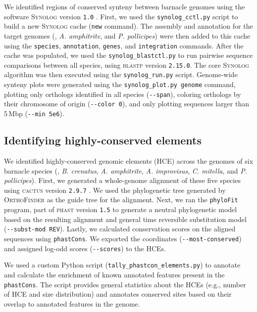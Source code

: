 We identified regions of conserved synteny between barnacle genomes using the software
\textsc{Synolog} version \texttt{1.0} \citep{madrigal_synolog_2026}.
First, we used the \texttt{synolog\_cctl.py} script to build a new \textsc{Synolog}
cache (\texttt{new} command).
The assembly and annotation for the target genomes (\bgla{},
\textit{A. amphitrite}, and \textit{P. pollicipes}) were then added to this cache
using the \texttt{species}, \texttt{annotation}, \texttt{genes}, and
\texttt{integration} commands.
After the cache was populated, we used the \texttt{synolog\_blastctl.py} to run
pairwise sequence comparisons between all species, using \textsc{blastp}
version \texttt{2.15.0}.
The core \textsc{Synolog} algorithm was then executed using the \texttt{synolog\_run.py}
script.
Genome-wide synteny plots were generated using the \texttt{synolog\_plot.py genome}
command, plotting only orthologs identified in all species (\texttt{-{}-span}), coloring
orthologs by their chromosome of origin (\texttt{-{}-color 0}), and only plotting
sequences larger than 5\,Mbp (\texttt{-{}-min 5e6}).

\subsection*{Identifying highly-conserved elements}

We identified highly-conserved genomic elements (HCE) across the genomes of six
barnacle species (\bgla, \textit{B. crenatus}, \textit{A. amphitrite},
\textit{A. improvisus}, \textit{C. mitella}, and \textit{P. pollicipes}).
First, we generated a whole-genome alignment of these five species using
\textsc{cactus} version \texttt{2.9.7} \citep{armstrong_progressive_2020}.
We used the phylogenetic tree generated by \textsc{OrthoFinder} as the guide tree
for the alignment.
Next, we ran the \texttt{phyloFit} program, part of \textsc{phast} version
\texttt{1.5} \citep{siepel_evolutionarily_2005} to generate a neutral
phylogenetic model based on the resulting alignment and general time reversible
substitution model (\texttt{-{}-subst-mod REV}).
Lastly, we calculated conservation scores on the aligned sequences using 
\texttt{phastCons}.
We exported the coordinates (\texttt{-{}-most-conserved}) and assigned
log-odd scores (\texttt{-{}-scores}) to the HCEs.
\vspace{0.1cm}

We used a custom Python script (\texttt{tally\_phastcon\_elements.py}) to
annotate and calculate the enrichment of known annotated features present in
the \texttt{phastCons}. The script provides general statistics about the HCEs
(e.g., number of HCE and size distribution) and annotates conserved sites
based on their overlap to annotated features in the genome.

